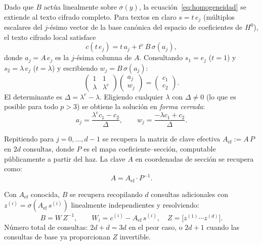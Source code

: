 \documentclass[12pt,a4paper]{article}
\theoremstyle{definition}
\begin{document}
Dado que $B$ actúa linealmente sobre $\sigma(y)$, la
ecuación~\eqref{eq:homogeneidad} se extiende al texto cifrado
completo. Para textos en claro $s = t\,e_j$ (múltiplos escalares del
$j$-ésimo vector de la base canónica del espacio de coeficientes de
$H^0$), el texto cifrado local satisface
\begin{equation}\label{eq:par}
  c(t\,e_j) = t\,a_j + t^e\,B\,\sigma(a_j),
\end{equation}
donde $a_j = A\,e_j$ es la $j$-ésima columna de $A$.
Consultando $s_1 = e_j$ ($t = 1$) y $s_2 = \lambda\,e_j$
($t = \lambda$) y escribiendo $w_j = B\,\sigma(a_j)$:
\begin{equation}\label{eq:sistema2x2}
  \begin{pmatrix} 1 & 1 \\ \lambda & \lambda^e \end{pmatrix}
  \begin{pmatrix} a_j \\ w_j \end{pmatrix}
  = \begin{pmatrix} c_1 \\ c_2 \end{pmatrix}.
\end{equation}
El determinante es $\Delta = \lambda^e - \lambda$. Eligiendo cualquier
$\lambda$ con $\Delta \neq 0$ (lo que es posible para todo $p > 3$)
se obtiene la solución en \emph{forma cerrada}:
\begin{equation}\label{eq:solucion}
  a_j = \frac{\lambda^e c_1 - c_2}{\Delta}, \qquad
  w_j = \frac{-\lambda c_1 + c_2}{\Delta}.
\end{equation}

Repitiendo para $j = 0, \ldots, d-1$ se recupera la matriz de clave
efectiva $A_{\text{ef}} := A\,P$ en $2d$ consultas, donde $P$ es el
mapa coeficiente--sección, computable públicamente a partir del haz.
La clave $A$ en coordenadas de sección se recupera como:
\begin{equation}
  A = A_{\text{ef}} \cdot P^{-1}.
\end{equation}

Con $A_{\text{ef}}$ conocida, $B$ se recupera recopilando $d$
consultas adicionales con $z^{(i)} = \sigma(A_{\text{ef}}\,s^{(i)})$
linealmente independientes y resolviendo:
\begin{equation}\label{eq:recuperacion-B}
  B = W\,Z^{-1}, \qquad
  W_i = c^{(i)} - A_{\text{ef}}\,s^{(i)}, \quad
  Z = \bigl[z^{(1)} \cdots z^{(d)}\bigr].
\end{equation}
Número total de consultas: $2d + d = 3d$ en el peor caso, o
$2d + 1$ cuando las consultas de base ya proporcionan $Z$ invertible.
\end{document}

